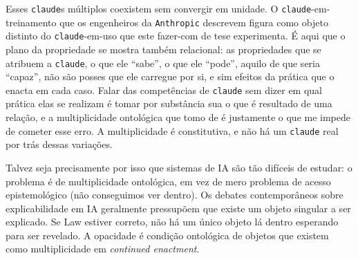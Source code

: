 Esses \texttt{claude}s múltiplos coexistem sem convergir em unidade. O \texttt{claude}-em-treinamento que os engenheiros da \texttt{Anthropic} descrevem figura como objeto distinto do \texttt{claude}-em-uso que este fazer-com de tese experimenta. É aqui que o plano da propriedade se mostra também relacional: as propriedades que se atribuem a \texttt{claude}, o que ele \enquote{sabe}, o que ele \enquote{pode}, aquilo de que seria \enquote{capaz}, não são posses que ele carregue por si, e sim efeitos da prática que o enacta em cada caso. Falar das competências de \texttt{claude} sem dizer em qual prática elas se realizam é tomar por substância sua o que é resultado de uma relação, e a multiplicidade ontológica que tomo de \textcite{mol2002body} é justamente o que me impede de cometer esse erro. A multiplicidade é constitutiva, e não há um \texttt{claude} real por trás dessas variações.

Talvez seja precisamente por isso que sistemas de IA são tão difíceis de estudar: o problema é de multiplicidade ontológica, em vez de mero problema de acesso epistemológico (não conseguimos ver dentro). Os debates contemporâneos sobre explicabilidade em IA geralmente pressupõem que existe um objeto singular a ser explicado. Se Law estiver correto, não há um único objeto lá dentro esperando para ser revelado. A opacidade é condição ontológica de objetos que existem como multiplicidade em \textit{continued enactment}.

